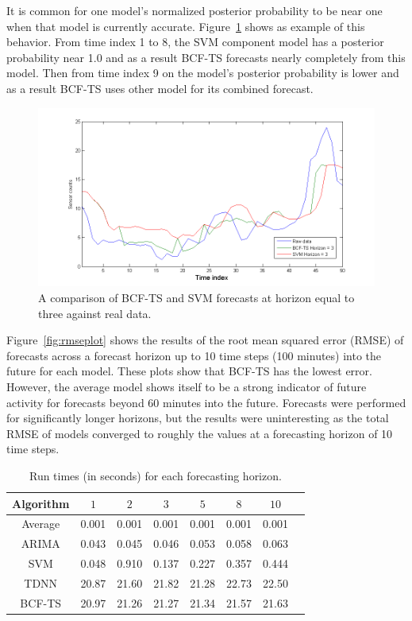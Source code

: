 \documentclass{acm_proc_article-sp}
\begin{document}
It is common for one model's normalized posterior probability to be near one when that model is currently accurate.  Figure~\ref{fig:realbcfsvm} shows as example of this behavior.  From time index 1 to 8, the SVM component model has a posterior probability near 1.0 and as a result BCF-TS forecasts nearly completely from this model.  Then from time index 9 on the model's posterior probability is lower and as a result BCF-TS uses other model for its combined forecast.

\begin{figure}[h]
\centering
\includegraphics[width = 1.0\linewidth]{real_forecasts_bcf_svm.png}
\caption{A comparison of BCF-TS and SVM forecasts at horizon equal to three against real data.}
\label{fig:realbcfsvm}
\end{figure}

Figure~\ref{fig:rmseplot} shows the results of the root mean squared error (RMSE) of forecasts across a forecast horizon up to 10 time steps (100 minutes) into the future for each model.  These plots show that BCF-TS has the lowest error.  However, the average model shows itself to be a strong indicator of future activity for forecasts beyond 60 minutes into the future.  Forecasts were performed for significantly longer horizons, but the results were uninteresting as the total RMSE of models converged to roughly the values at a forecasting horizon of 10 time steps.  

\begin{table}
\centering
\caption{Run times (in seconds) for each forecasting horizon.}
\begin{tabular}{|c|c|c|c|c|c|c|c|} \hline
Algorithm & $1$ & $2$ & $3$ & $5$ & $8$ & $10$ \\ \hline
Average & 0.001 & 0.001 & 0.001 & 0.001 & 0.001 & 0.001 \\ \hline
ARIMA & 0.043 & 0.045 & 0.046 & 0.053 & 0.058 & 0.063\\ \hline
SVM & 0.048 & 0.910 & 0.137 & 0.227 & 0.357 & 0.444 \\ \hline
TDNN & 20.87 & 21.60 & 21.82 & 21.28 & 22.73 & 22.50 \\ \hline
BCF-TS & 20.97 & 21.26 & 21.27 & 21.34 & 21.57 & 21.63\\ \hline
\end{tabular}
\label{fig:runtimestab}
\end{table}
\end{document}
